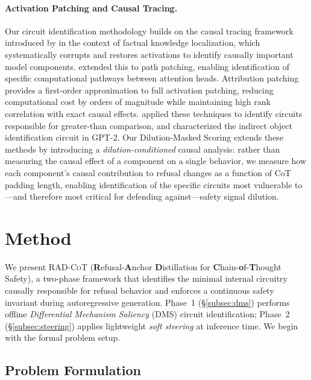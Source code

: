 \documentclass[11pt]{article}
\begin{document}
\paragraph{Activation Patching and Causal Tracing.}
Our circuit identification methodology builds on the causal tracing framework introduced by \citet{meng2022locating} in the context of factual knowledge localization, which systematically corrupts and restores activations to identify causally important model components. \citet{goldowskydill2023localizing} extended this to path patching, enabling identification of specific computational pathways between attention heads. Attribution patching \citep{nanda2023attribution, syed2023attribution} provides a first-order approximation to full activation patching, reducing computational cost by orders of magnitude while maintaining high rank correlation with exact causal effects. \citet{hanna2023how} applied these techniques to identify circuits responsible for greater-than comparison, and \citet{wang2023interpretability} characterized the indirect object identification circuit in GPT-2. Our Dilution-Masked Scoring extends these methods by introducing a \emph{dilution-conditioned} causal analysis: rather than measuring the causal effect of a component on a single behavior, we measure how each component's causal contribution to refusal changes as a function of CoT padding length, enabling identification of the specific circuits most vulnerable to---and therefore most critical for defending against---safety signal dilution.
\section{Method}
\label{sec:method}

We present \textsc{RAD-CoT} (\textbf{R}efusal-\textbf{A}nchor \textbf{D}istillation for \textbf{C}hain-\textbf{o}f-\textbf{T}hought Safety), a two-phase framework that identifies the minimal internal circuitry causally responsible for refusal behavior and enforces a continuous safety invariant during autoregressive generation. Phase~1 (\S\ref{subsec:dms}) performs offline \emph{Differential Mechanism Saliency} (DMS) circuit identification; Phase~2 (\S\ref{subsec:steering}) applies lightweight \emph{soft steering} at inference time. We begin with the formal problem setup.

\subsection{Problem Formulation}
\label{subsec:problem}
\end{document}
